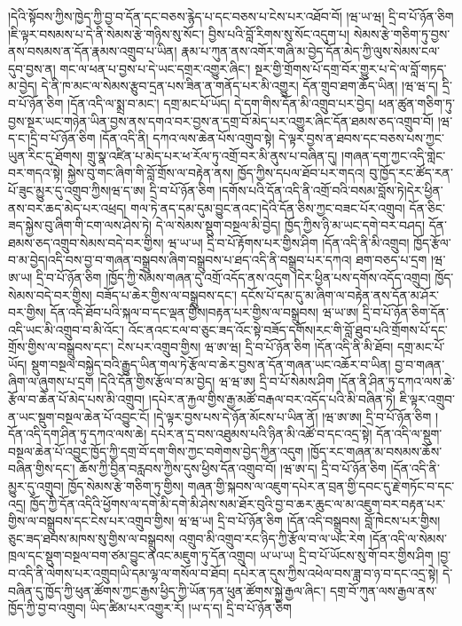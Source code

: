 །དེའི་སྟོབས་ཀྱིས་ཁྱེད་ཀྱི་བྱ་བ་དོན་དང་བཅས་རྙེད་པ་དང་བཅས་པ་ངེས་པར་འཐོབ་བོ། །ཝ་ཡ་ཝ། དྲི་བ་པོ་ཉོན་ཅིག །ཇི་ལྟར་བསམས་པ་དེ་ནི་སེམས་རྩེ་གཉིས་སུ་སོང་། བྱིས་པའི་བློ་རིགས་སུ་སོང་འདུག་པ། སེམས་རྩེ་གཅིག་ཏུ་བྱས་ནས་བསམས་ན་དོན་རྣམས་འགྲུབ་པ་ཡིན། རྣམ་པ་ཀུན་ནས་འགོར་གཞི་མ་བྱེད་དོན་མེད་ཀྱི་ལུས་སེམས་ངལ་དུབ་བྱས་ན། གང་ལ་ཕན་པ་བྱས་པ་དེ་ཡང་དགྲར་འགྱུར་ཞིང་། སྔར་གྱི་གྲོགས་པོ་དགྲ་བོར་གྱུར་པ་དེ་ལ་བློ་གཏད་མ་བྱེད། དེ་ནི་ཁ་མང་ལ་སེམས་རྩུབ་དྲན་པས་ཟིན་ན་གནོད་པར་མི་འགྱུར། དོན་གྲུབ་ཐག་ཆོད་ཡིན། །ཝ་ཝ་ད། དྲི་བ་པོ་ཉོན་ཅིག །དོན་འདི་ལ་སྨྲ་བ་མང་། དགྲ་མང་པོ་ཡོད། དེ་དག་གིས་དོན་མི་འགྲུབ་པར་བྱེད། ཕན་ཚུན་གཅིག་ཏུ་བྱས་སྔར་ཡང་གཉེན་ཡིན་བྱས་ནས་དགའ་བར་བྱས་ན་དགྲ་བོ་མེད་པར་འགྱུར་ཞིང་དོན་ཐམས་ཅད་འགྲུབ་བོ། །ཝ་ད་ང་།དྲི་བ་པོ་ཉོན་ཅིག །དོན་འདི་ནི། དཀའ་ལས་ཆེན་པོས་འགྲུབ་སྟེ། དེ་ལྟར་བྱས་ན་ཐབས་དང་བཅས་པས་ཀྱང་ཡུན་རིང་དུ་ཐོགས། གྲུ་སྣ་འཛིན་པ་མེད་པར་ཕ་རོལ་ཏུ་འགྲོ་བར་མི་ནུས་པ་བཞིན་དུ། །གཞན་དག་ཀྱང་འདི་གླེང་བར་གདའ་སྟེ། སྐྱེས་བུ་གང་ཞིག་གི་བློ་གྲོས་ལ་བརྟེན་ནས། ཁྱོད་ཀྱིས་དཔལ་ཐོབ་པར་གདའ། བུ་ཁྱོད་རང་ཚོད་རན་པོ་ཟུང་མྱུར་དུ་འགྲུབ་ཀྱིས།ཝ་ད་ཨ། དྲི་བ་པོ་ཉོན་ཅིག །དགོས་པའི་དོན་འདི་ནི་འགྲོ་བའི་བསམ་བློས་ཏེ།དེར་ཕྱིན་ནས་བར་ཆད་མེད་པར་འཕྲད། གལ་ཏེ་ནད་དམ་དུམ་བྱུང་ནའང་།དེའི་དོན་ཅིས་ཀྱང་བཟང་པོར་འགྲུབ། དོན་ཅིང་ཟད་སྐྱེས་བུ་ཞིག་གི་ངག་ལས་ཤེས་ཏེ། དེ་ལ་སེམས་སྡུག་བསྔལ་མི་བྱེད། ཁྱོད་ཀྱིས་ཉི་མ་ཡང་དགེ་བར་བཤད། དོན་ཐམས་ཅད་འགྲུབ་སེམས་བདེ་བར་གྱིས། ཝ་ཡ་ཡ། དྲི་བ་པོ་རྟོགས་པར་གྱིས་ཤིག །དོན་འདི་ནི་མི་འགྲུབ། ཁྱོད་རྩོལ་བ་མ་བྱེད།འདི་བས་བྱ་བ་གཞན་བསྒྲུབས་ཞིག་བསྒྲུབས་པ་ཐད་འདི་ནི་བསྒྲུབ་པར་དཀའ། ཐག་བཅད་པ་དྲག །ཝ་ཨ་ཡ། དྲི་བ་པོ་ཉོན་ཅིག །ཁྱོད་ཀྱི་སེམས་གཞན་དུ་འགྲོ་འདོད་ནས་འདུག །དེར་ཕྱིན་པས་དགོས་འདོད་འགྲུབ། ཁྱོད་སེམས་བདེ་བར་གྱིས། བཟོད་པ་ཆེར་གྱིས་ལ་བསྒྲུབས་དང་། དངོས་པོ་དམ་དུ་མ་ཞིག་ལ་བརྟེན་ནས་དོན་མ་ཤོར་བར་གྱིས། དོན་འདི་ཐོབ་པའི་སྐལ་བ་དང་ལྡན་གྱིས།བརྟན་པར་གྱིས་ལ་བསྒྲུབས། ཝ་ཡ་ཨ། དྲི་བ་པོ་ཉོན་ཅིག་དོན་འདི་ཡང་མི་འགྲུབ་བ་མི་འོང་། འོང་ནའང་ངལ་བ་ཅུང་ཟད་འོང་སྟེ་བཟོད་དགོས།རང་གི་བློ་ཐུབ་པའི་གྲོགས་པོ་དང་གྲོས་གྱིས་ལ་བསྒྲུབས་དང་། ངེས་པར་འགྲུབ་གྱིས། ཝ་ཨ་ཝ། དྲི་བ་པོ་ཉོན་ཅིག །དོན་འདི་ནི་མི་ཐོབ། དགྲ་མང་པོ་ཡོད། སྡུག་བསྔལ་བསྐྱེད་བའི་རྒྱུད་ཡིན་གལ་ཏེ་རྩོལ་བ་ཆེར་བྱས་ན་དོན་གཞན་ཡང་འཆོར་བ་ཡིན། བྱ་བ་གཞན་ཞིག་ལ་ཞུགས་པ་དྲག །དེའི་དོན་གྱིས་རྩོལ་བ་མ་བྱེད། ཝ་ཝ་ཨ། དྲི་བ་པོ་སེམས་ཤིག །དོན་ནི་ཤིན་ཏུ་དཀའ་ལས་ཆེ་རྩོལ་བ་ཆེན་པོ་མེད་པས་མི་འགྲུབ། །དཔེར་ན་རྐྱལ་གྱིས་རྒྱ་མཚོ་བརྒལ་བར་འདོད་པའི་མི་བཞིན་ཏེ། ཇི་ལྟར་འགྲུབ་ན་ཡང་སྡུག་བསྔལ་ཆེན་པོ་འབྱུང་ངོ། །དེ་ལྟར་བྱས་པས་དེ་ཉོན་མོངས་པ་ཡིན་ནོ། །ཝ་ཨ་ཨ། དྲི་བ་པོ་ཉོན་ཅིག །དོན་འདི་དག་ཤིན་ཏུ་དཀའ་ལས་ཆེ། དཔེར་ན་དྲ་བས་འཐུམས་པའི་ཉིན་མི་འཚོ་བ་དང་འདྲ་སྟེ། དོན་འདི་ལ་སྡུག་བསྔལ་ཆེན་པོ་འབྱུང་ཁྱོད་ཀྱི་དགྲ་བོ་དག་གིས་ཀྱང་བགེགས་བྱེད་ཀྱིན་འདུག །ཁྱོད་རང་གཞན་མ་བསམས་ཆོས་བཞིན་གྱིས་དང་། ཆོས་ཀྱི་བྱིན་བརླབས་ཀྱིས་དུས་ཕྱིས་དོན་འགྲུབ་བོ། །ཝ་ཨ་ད། དྲི་བ་པོ་ཉོན་ཅིག །དོན་འདི་ནི་མྱུར་དུ་འགྲུབ། ཁྱོད་སེམས་རྩེ་གཅིག་ཏུ་གྱིས། གཞན་གྱི་སྐབས་ལ་འཇུག་དཔེར་ན་བྲན་གྱི་དབང་དུ་རྗེ་གཏོང་བ་དང་འདྲ། ཁྱོད་ཀྱི་དོན་འདིའི་ཕྱོགས་ལ་དགེ་མི་དགེ་མི་ཤེས་སམ་ཐོར་བུའི་བྱ་བ་ཆར་ཆུང་ལ་མ་འཇུག་བར་བརྟན་པར་གྱིས་ལ་བསྒྲུབས་དང་ངེས་པར་འགྲུབ་གྱིས། ཝ་ཝ་ཡ། དྲི་བ་པོ་ཉོན་ཅིག །དོན་འདི་བསྒྲུབས། བློ་ཁེངས་པར་གྱིས། ཅུང་ཟད་ཐབས་མཁས་སུ་གྱིས་ལ་བསྒྲུབས། འགྲུབ་མི་འགྲུབ་རང་ཉིད་ཀྱི་རྩོལ་བ་ལ་ཡང་རེག །དོན་འདི་ལ་སེམས་ཁྲལ་དང་སྡུག་བསྔལ་བག་ཙམ་བྱུང་ནའང་མཇུག་ཏུ་དོན་འགྲུབ། ཡ་ཡ་ཡ། དྲི་བ་པོ་ཡོངས་སུ་གོ་བར་གྱིས་ཤིག །བྱ་བ་འདི་ནི་ལེགས་པར་འགྲུབ།ཡི་དམ་ལྷ་ལ་གསོལ་བ་ཐོབ། དཔེར་ན་དུས་ཀྱིས་འཕེལ་བས་ཟླ་བ་ཉ་བ་དང་འདྲ་སྟེ། དེ་བཞིན་དུ་ཁྱོད་ཀྱི་ཕུན་ཚོགས་ཀྱང་རྒྱས་ཕྱིད་ཀྱི་ཡོན་ཏན་ཕུན་ཚོགས་སྐྱེ་རྒྱལ་ཞིང་། དགྲ་བོ་ཀུན་ལས་རྒྱལ་ནས་ཁྱོད་ཀྱི་བྱ་བ་འགྲུབ། ཡིད་ཚིམ་པར་འགྱུར་རོ། །ཡ་ད་ད། དྲི་བ་པོ་ཉོན་ཅིག 